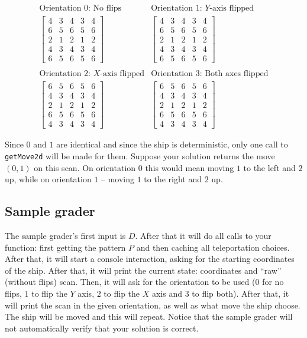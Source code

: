 \documentclass[12pt]{article}
\begin{document}
\[
\begin{array}{cc}
\text{Orientation $0$: No flips} & \text{Orientation $1$: $Y$-axis flipped} \\
\left[
\begin{array}{ccccc}
4 & 3 & 4 & 3 & 4 \\
6 & 5 & 6 & 5 & 6 \\
2 & 1 & 2 & 1 & 2 \\
4 & 3 & 4 & 3 & 4 \\
6 & 5 & 6 & 5 & 6
\end{array}
\right]
&
\left[
\begin{array}{ccccc}
4 & 3 & 4 & 3 & 4 \\
6 & 5 & 6 & 5 & 6 \\
2 & 1 & 2 & 1 & 2 \\
4 & 3 & 4 & 3 & 4 \\
6 & 5 & 6 & 5 & 6
\end{array}
\right]
\\
\\
\text{Orientation $2$: $X$-axis flipped} & \text{Orientation $3$: Both axes flipped} \\
\left[
\begin{array}{ccccc}
6 & 5 & 6 & 5 & 6 \\
4 & 3 & 4 & 3 & 4 \\
2 & 1 & 2 & 1 & 2 \\
6 & 5 & 6 & 5 & 6 \\
4 & 3 & 4 & 3 & 4
\end{array}
\right]
&
\left[
\begin{array}{ccccc}
6 & 5 & 6 & 5 & 6 \\
4 & 3 & 4 & 3 & 4 \\
2 & 1 & 2 & 1 & 2 \\
6 & 5 & 6 & 5 & 6 \\
4 & 3 & 4 & 3 & 4
\end{array}
\right]
\end{array}
\] 

Since $0$ and $1$ are identical and since the ship is deterministic, only one call to \verb|getMove2d| will be made for them. Suppose your solution returns the move $(0, 1)$ on this scan. On orientation $0$ this would mean moving $1$ to the left and $2$ up, while on orientation $1$ -- moving $1$ to the right and $2$ up.

\subsection{Sample grader}

The sample grader's first input is $D$. After that it will do all calls to your function: first getting the pattern $P$ and then caching all teleportation choices. After that, it will start a console interaction, asking for the starting coordinates of the ship. After that, it will print the current state: coordinates and ``raw'' (without flips) scan. Then, it will ask for the orientation to be used ($0$ for no flips, $1$ to flip the $Y$ axis, $2$ to flip the $X$ axis and $3$ to flip both). After that, it will print the scan in the given orientation, as well as what move the ship choose. The ship will be moved and this will repeat. Notice that the sample grader will not automatically verify that your solution is correct.
\end{document}
